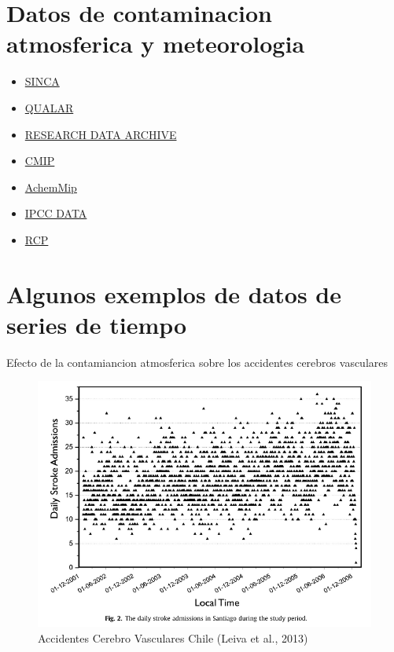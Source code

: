 \documentclass[]{book}
\providecommand{\tightlist}{%
  \setlength{\itemsep}{0pt}\setlength{\parskip}{0pt}}
\begin{document}
\hypertarget{datos-de-contaminacion-atmosferica-y-meteorologia}{%
\section{Datos de contaminacion atmosferica y meteorologia}\label{datos-de-contaminacion-atmosferica-y-meteorologia}}

\begin{itemize}
\tightlist
\item
  \href{https://sinca.mma.gob.cl/}{SINCA}
\item
  \href{https://qualar.cetesb.sp.gov.br/qualar/home.do}{QUALAR}
\item
  \href{https://rda.ucar.edu/}{RESEARCH DATA ARCHIVE}
\item
  \href{https://esgf-node.llnl.gov/projects/cmip6/}{CMIP}
\item
  \href{https://wiki.met.no/aerocom/aerchemmip/start}{AchemMip}
\item
  \href{https://www.ipcc.ch/data/}{IPCC DATA}
\item
  \href{http://www.iiasa.ac.at/web-apps/tnt/RcpDb/dsd?Action=htmlpage\&page=welcome}{RCP}
\end{itemize}

\hypertarget{algunos-exemplos-de-datos-de-series-de-tiempo}{%
\section{Algunos exemplos de datos de series de tiempo}\label{algunos-exemplos-de-datos-de-series-de-tiempo}}

Efecto de la contamiancion atmosferica sobre los accidentes cerebros vasculares

\begin{figure}
\includegraphics[width=10.92in]{figs/strokes} \caption{Accidentes Cerebro Vasculares Chile (Leiva et al., 2013)}\label{fig:unnamed-chunk-3}
\end{figure}
\end{document}
